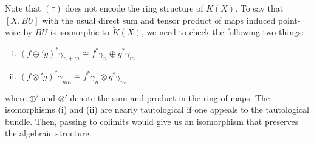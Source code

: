 \documentclass[11pt,a4paper]{article}
\begin{document}
\begin{remark}
Note that $(\dagger)$ does not encode the ring structure of $K(X)$. To say that $[X, BU]$ with the usual direct sum and tensor product of maps induced point-wise by $BU$ is isomorphic to $\widetilde{K}(X)$, we need to check the following two things:
\begin{enumerate}[(i)]
    \item $(f\oplus' g)^*\gamma_{n+m} \cong f^*\gamma_n\oplus g^*\gamma_m$
    \item $(f\otimes' g)^*\gamma_{nm} \cong f^*\gamma_n\otimes g^*\gamma_m$
\end{enumerate}
where $\oplus'$ and $\otimes'$ denote the sum and product in the ring of maps. The isomorphisms (i) and (ii) are nearly tautological if one appeals to the tautological bundle. Then, passing to colimits would give us an isomorphism that preserves the algebraic structure.
\end{remark}


\end{document}
